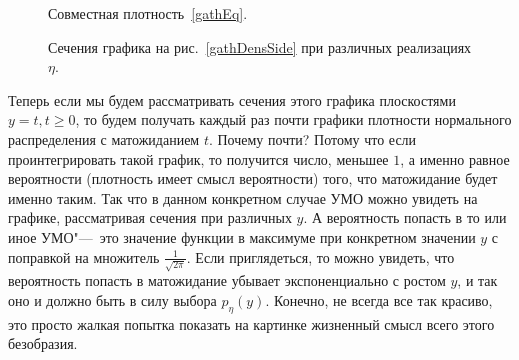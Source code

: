\documentclass[../TV&MS.tex]{subfiles}
\begin{document}
\begin{figure}
\centering
\begin{minipage}[b]{0.5\textwidth}
    \centering
    \vfill
    \caption{Совместная плотность~\eqref{gathEq}.}
    \label{gathDensSide}
\end{minipage}%
\hfill
\begin{minipage}[b]{0.5\textwidth}
    \centering
    \vfill
    \caption{Сечения графика на рис.~\ref{gathDensSide} 
    		 при различных реализациях $\eta$.}
    \label{cutsGathDens}
\end{minipage}
\end{figure}

	Теперь если мы будем рассматривать сечения этого графика плоскостями
	$y=t, t \geqslant 0$, то будем получать каждый раз почти графики плотности
	нормального распределения с матожиданием $t$. Почему почти? Потому что 
	если проинтегрировать такой график, то получится число, меньшее $1$, 
	а именно равное вероятности (плотность имеет смысл вероятности) того, 
	что матожидание будет именно таким. Так что в данном конкретном случае 
	УМО можно увидеть на графике, рассматривая сечения при различных $y$.
	А вероятность попасть в то или иное УМО"---~это значение функции в максимуме
	при конкретном значении $y$ с поправкой на множитель $\frac{1}{\sqrt{2\pi}}$. 
	Если приглядеться, то можно увидеть, что вероятность попасть в матожидание
	убывает экспоненциально с ростом $y$, и так оно и должно быть в силу выбора
	$p_\eta(y)$. Конечно, не всегда все так красиво, это просто жалкая попытка 
	показать на картинке жизненный смысл всего этого безобразия.
\newpage
\end{document}
